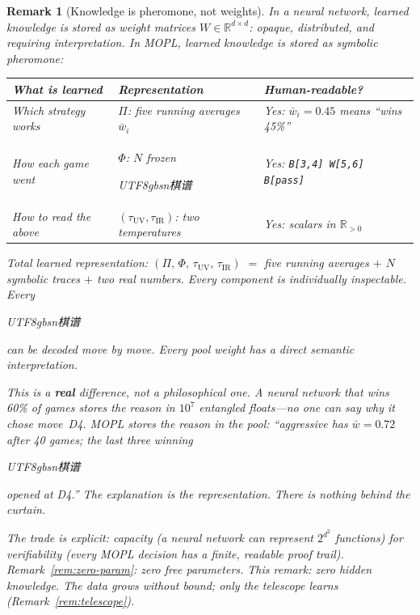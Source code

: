 \documentclass[11pt,a4paper]{article}
\newtheorem{remark}[theorem]{Remark}
\begin{document}
\begin{remark}[Knowledge is pheromone, not weights]%
\label{rem:knowledge-is-pheromone}
\color{black!60}%
In a neural network, learned knowledge is stored as
weight matrices $W \in \mathbb{R}^{d \times d}$:
opaque, distributed, and requiring interpretation.
In MOPL, learned knowledge is stored as
\emph{symbolic pheromone}:
\begin{center}
\small
\begin{tabular}{@{}lll@{}}
\toprule
\textbf{What is learned} & \textbf{Representation}
  & \textbf{Human-readable?} \\
\midrule
Which strategy works &
  $\Pi$: five running averages $\bar{w}_i$ &
  Yes: $\bar{w}_i = 0.45$ means ``wins 45\%'' \\
How each game went &
  $\Phi$: $N$ frozen
  \begin{CJK}{UTF8}{gbsn}棋谱\end{CJK} &
  Yes: \texttt{B[3,4] W[5,6] B[pass]} \\
How to read the above &
  $(\tau_{\text{UV}}, \tau_{\text{IR}})$: two temperatures &
  Yes: scalars in $\mathbb{R}_{>0}$ \\
\bottomrule
\end{tabular}
\end{center}

\noindent
Total learned representation:
$(\Pi,\, \Phi,\, \tau_{\text{UV}},\, \tau_{\text{IR}})$
$=$ five running averages $+$ $N$ symbolic traces $+$
two real numbers.
Every component is individually inspectable.
Every \begin{CJK}{UTF8}{gbsn}棋谱\end{CJK} can be
decoded move by move.
Every pool weight has a direct semantic interpretation.

\medskip\noindent
This is a \textbf{real} difference, not a philosophical one.
A neural network that wins 60\% of games stores the reason
in $10^7$ entangled floats---no one can say \emph{why}
it chose move~D4.
MOPL stores the reason in the pool:
``\textit{aggressive} has $\bar{w} = 0.72$ after 40 games;
the last three winning
\begin{CJK}{UTF8}{gbsn}棋谱\end{CJK}
opened at D4.''
The explanation \emph{is} the representation.
There is nothing behind the curtain.

\medskip\noindent
The trade is explicit:
\emph{capacity} (a neural network can represent
$2^{d^2}$ functions) for \emph{verifiability}
(every MOPL decision has a finite, readable proof trail).
Remark~\ref{rem:zero-param}: zero free parameters.
This remark: zero hidden knowledge.
The data grows without bound; only the telescope learns
(Remark~\ref{rem:telescope}).
\end{remark}
\end{document}
